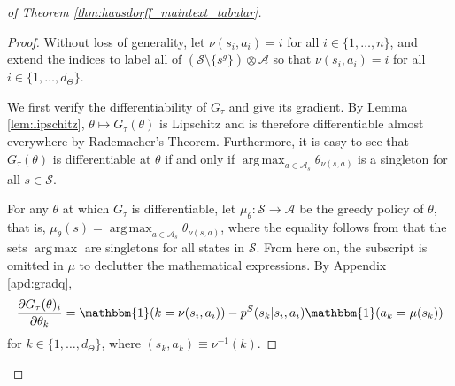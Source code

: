 \documentclass{amsart}
\DeclareMathOperator*{\argmax}{arg\,max}
\begin{document}
\begin{proof}[of Theorem \ref{thm:hausdorff_maintext_tabular}]
\begin{proof}

Without loss of generality, let  $\nu(s_i,a_i)=i$ for all $i \in \{1,\dots,n\}$, and extend the indices to label all of $(\mathcal{S} \setminus \{s^g\}) \otimes \mathcal{A}$ so that  $\nu(s_i,a_i)=i$ for all $i \in \{1,\dots,d_\Theta\}$. 




We first verify the differentiability of $G_\tau$ and give its gradient. By Lemma \ref{lem:lipschitz}, $\theta \mapsto G_\tau(\theta)$ is Lipschitz and is therefore differentiable almost everywhere by Rademacher's Theorem. Furthermore, it is easy to see that $G_\tau(\theta)$ is differentiable at $\theta$ if and only if  $\argmax_{a\in \mathcal{A}_s} \theta_{\nu(s,a)}$ is a singleton for all $s \in \mathcal{S}$. 

For any $\theta$ at which $G_\tau$ is differentiable, let $\mu_{\theta}:\mathcal{S} \rightarrow \mathcal{A}$  be the greedy policy of $\theta$, that is,  $\mu_{\theta}(s) = \argmax_{a \in \mathcal{A}_s} \theta_{\nu(s,a)}$, where the equality follows from that the sets $\argmax$ are singletons for all states in $\mathcal{S}$. From here on, the subscript is omitted in $\mu$ to declutter the mathematical expressions. By Appendix \ref{apd:gradq},
$$\frac{\partial G_\tau(\theta)_i}{\partial \theta_k}=\mathbbm{1}(k=\nu(s_i,a_i)) - p^S(s_k|s_i,a_i)  \mathbbm{1}(a_k =\mu(s_k) )
$$
 for $k \in \{1,\dots,d_{\Theta}\}$, where $(s_k,a_k)\equiv\nu^{-1}(k)$.\newline


\end{proof}
\end{proof}
\end{document}
